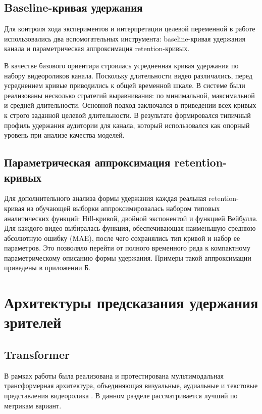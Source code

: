 \documentclass[times]{itmo-student-thesis}
\begin{document}
\subsection{Baseline-кривая удержания}

Для контроля хода экспериментов и интерпретации целевой переменной в работе использовались два вспомогательных инструмента: baseline-кривая удержания канала и параметрическая аппроксимация retention-кривых.

В качестве базового ориентира строилась усредненная кривая удержания по набору видеороликов канала. Поскольку длительности видео различались, перед усреднением кривые приводились к общей временной шкале. В системе были реализованы несколько стратегий выравнивания: по минимальной, максимальной и средней длительности. Основной подход заключался в приведении всех кривых к строго заданной целевой длительности. В результате формировался типичный профиль удержания аудитории для канала, который использовался как опорный уровень при анализе качества моделей.

\subsection{Параметрическая аппроксимация retention-кривых}

Для дополнительного анализа формы удержания каждая реальная retention-кривая из обучающей выборки аппроксимировалась набором типовых аналитических функций: Hill-кривой, двойной экспонентой и функцией Вейбулла. Для каждого видео выбиралась функция, обеспечивающая наименьшую среднюю абсолютную ошибку (MAE), после чего сохранялись тип кривой и набор ее параметров. Это позволяло перейти от полного временного ряда к компактному параметрическому описанию формы удержания. Примеры такой аппроксимации приведены в приложении Б.

\section{Архитектуры предсказания удержания зрителей}

\subsection{Transformer}

В рамках работы была реализована и протестирована мультимодальная трансформерная архитектура, объединяющая визуальные, аудиальные и текстовые представления видеоролика \cite{vaswani2017attention}. В данном разделе рассматривается лучший по метрикам вариант.
\end{document}
